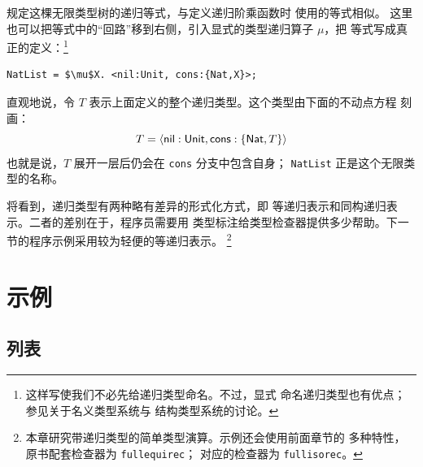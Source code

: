 \begin{center}
\centering
{}
\end{center}

规定这棵无限类型树的递归等式，与定义递归阶乘函数时
使用的等式相似。
这里也可以把等式中的“回路”移到右侧，引入显式的类型递归算子 \(\mu\)，把
等式写成真正的定义：\footnote{这样写使我们不必先给递归类型命名。不过，显式
命名递归类型也有优点；参见关于名义类型系统与
结构类型系统的讨论。}
\begin{lstlisting}[mathescape=true]
NatList = $\mu$X. <nil:Unit, cons:{Nat,X}>;
\end{lstlisting}
直观地说，令 \(T\) 表示上面定义的整个递归类型。这个类型由下面的不动点方程
刻画：
\[
T=\langle\mathsf{nil}:\mathsf{Unit},
          \mathsf{cons}:\{\mathsf{Nat},T\}\rangle
\]
也就是说，\(T\) 展开一层后仍会在 \texttt{cons} 分支中包含自身；
\texttt{NatList} 正是这个无限类型的名称。

将看到，递归类型有两种略有差异的形式化方式，即
等递归表示和同构递归表示。二者的差别在于，程序员需要用
类型标注给类型检查器提供多少帮助。下一节的程序示例采用较为轻便的等递归表示。
\footnote{本章研究带递归类型的简单类型演算。示例还会使用前面章节的
多种特性，原书配套检查器为 \texttt{fullequirec}；
对应的检查器为 \texttt{fullisorec}。}

\section{示例}
\label{sec:20.1}

\subsection*{列表}


